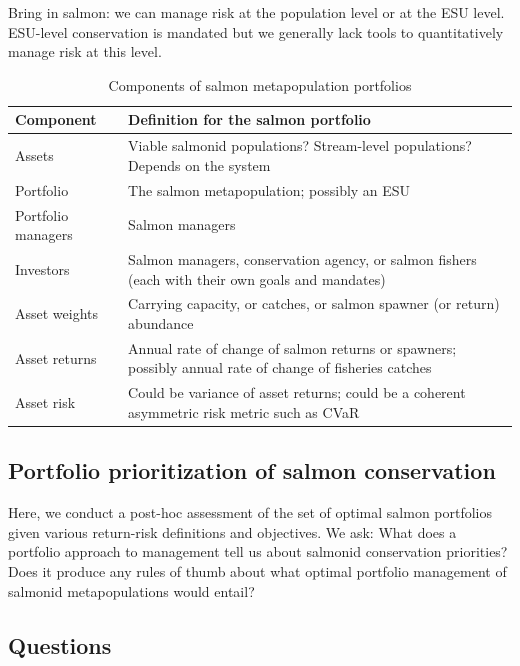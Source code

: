\documentclass[12pt]{article}
\begin{document}
Bring in salmon: we can manage risk at the population level or at the
ESU level. ESU-level conservation is mandated but we generally lack
tools to quantitatively manage risk at this level.

\begin{table}[h!]
\centering
\small
\caption{Components of salmon metapopulation portfolios}
\begin{tabular}{p{3.6cm}p{7.5cm}}
\toprule
Component & Definition for the salmon portfolio\\
\midrule
Assets & Viable salmonid populations? Stream-level populations? Depends on the 
system\\
Portfolio & The salmon metapopulation; possibly an ESU\\
Portfolio managers & Salmon managers\\
Investors & Salmon managers, conservation agency, or salmon fishers (each with 
their own goals and mandates)\\
Asset weights & Carrying capacity, or catches, or salmon spawner (or return) 
abundance\\
Asset returns & Annual rate of change of salmon returns or spawners; possibly 
annual rate of change of fisheries catches\\
Asset risk & Could be variance of asset returns; could be a coherent asymmetric 
risk metric such as CVaR\\
\bottomrule
\end{tabular}
\label{tab:port-components}
\end{table}

\subsection{Portfolio prioritization of salmon conservation}

Here, we conduct a post-hoc assessment of the set of optimal salmon
portfolios given various return-risk definitions and objectives. We ask:
What does a portfolio approach to management tell us about salmonid
conservation priorities? Does it produce any rules of thumb about what
optimal portfolio management of salmonid metapopulations would entail?

\subsection{Questions}
\end{document}
